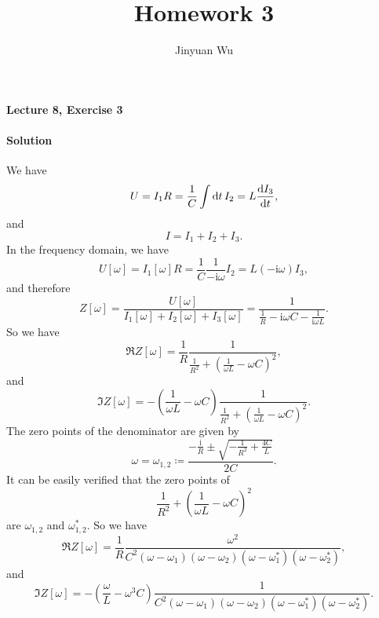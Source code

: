 \documentclass[hyperref, a4paper]{article}
\title{Homework 3}
\author{Jinyuan Wu}
\newcommand*{\ii}{\mathrm{i}}
\begin{document}
\maketitle

\paragraph{Lecture 8, Exercise 3}

\paragraph{Solution} We have 
\[
    U = I_1 R = \frac{1}{C} \int \dd{t} I_2 = L \dv{I_3}{t},
\]
and 
\[
    I = I_1 + I_2 + I_3.
\]
In the frequency domain, we have 
\[
    U[\omega] = I_1[\omega] R = \frac{1}{C} \frac{1}{- \ii \omega} I_2 = L (- \ii \omega) I_3,
\]
and therefore 
\begin{equation}
    Z[\omega] = \frac{U[\omega]}{I_1[\omega] + I_2[\omega] + I_3[\omega]} 
    = \frac{1}{\frac{1}{R} - \ii \omega C - \frac{1}{\ii \omega L}}.
\end{equation}
So we have 
\begin{equation}
    \Re Z[\omega] = \frac{1}{R} \frac{1}{\frac{1}{R^2} + \left( \frac{1}{\omega L} - \omega C \right)^2},
\end{equation}
and 
\begin{equation}
    \Im Z[\omega] = - \left( \frac{1}{\omega L} - \omega C \right) \frac{1}{\frac{1}{R^2} + \left( \frac{1}{\omega L} - \omega C \right)^2}.
\end{equation}
The zero points of the denominator are given by 
\begin{equation}
    \omega = \omega_{1, 2} \coloneqq \frac{- \frac{\ii}{R} \pm \sqrt{- \frac{1}{R^2} + \frac{4C}{L}}}{2 C}.
\end{equation}
It can be easily verified that the zero points of 
\[
    \frac{1}{R^2} + \left( \frac{1}{\omega L} - \omega C \right)^2
\]
are $\omega_{1, 2}$ and $\omega_{1, 2}^*$.
So we have 
\begin{equation}
    \Re Z[\omega] = \frac{1}{R} \frac{\omega^2}{C^2 
    (\omega - \omega_1) (\omega - \omega_2) (\omega - \omega_1^*) (\omega - \omega_2^*)},
\end{equation}
and 
\begin{equation}
    \Im Z[\omega] = - \left(\frac{\omega}{L} - \omega^3 C \right) 
    \frac{1}{C^2 
    (\omega - \omega_1) (\omega - \omega_2) (\omega - \omega_1^*) (\omega - \omega_2^*)}.
\end{equation}
\end{document}
